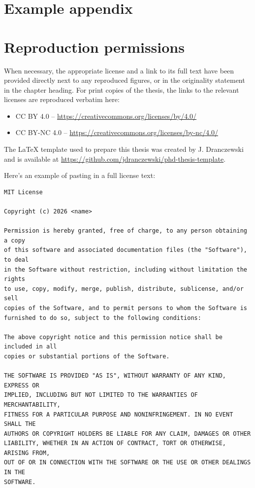 \chapter{Example appendix}

\lipsum[1-3]

\chapter*{Reproduction permissions}
When necessary, the appropriate license and a link to its full text have been provided directly next to any reproduced figures, or in the originality statement in the chapter heading. For print copies of the thesis, the links to the relevant licenses are reproduced verbatim here:
\begin{itemize}
	\item CC BY 4.0 -- \url{https://creativecommons.org/licenses/by/4.0/}
	\item CC BY-NC 4.0 -- \url{https://creativecommons.org/licenses/by-nc/4.0/}
\end{itemize}

\vspace{4ex}
The LaTeX template used to prepare this thesis was created by J. Dranczewski and is available at \url{https://github.com/jdranczewski/phd-thesis-template}.

\vspace{4ex}
Here's an example of pasting in a full license text:

\begin{lstlisting}[basicstyle=\footnotesize, upquote=false]
MIT License

Copyright (c) 2026 <name>

Permission is hereby granted, free of charge, to any person obtaining a copy
of this software and associated documentation files (the "Software"), to deal
in the Software without restriction, including without limitation the rights
to use, copy, modify, merge, publish, distribute, sublicense, and/or sell
copies of the Software, and to permit persons to whom the Software is
furnished to do so, subject to the following conditions:

The above copyright notice and this permission notice shall be included in all
copies or substantial portions of the Software.

THE SOFTWARE IS PROVIDED "AS IS", WITHOUT WARRANTY OF ANY KIND, EXPRESS OR
IMPLIED, INCLUDING BUT NOT LIMITED TO THE WARRANTIES OF MERCHANTABILITY,
FITNESS FOR A PARTICULAR PURPOSE AND NONINFRINGEMENT. IN NO EVENT SHALL THE
AUTHORS OR COPYRIGHT HOLDERS BE LIABLE FOR ANY CLAIM, DAMAGES OR OTHER
LIABILITY, WHETHER IN AN ACTION OF CONTRACT, TORT OR OTHERWISE, ARISING FROM,
OUT OF OR IN CONNECTION WITH THE SOFTWARE OR THE USE OR OTHER DEALINGS IN THE
SOFTWARE.
\end{lstlisting}